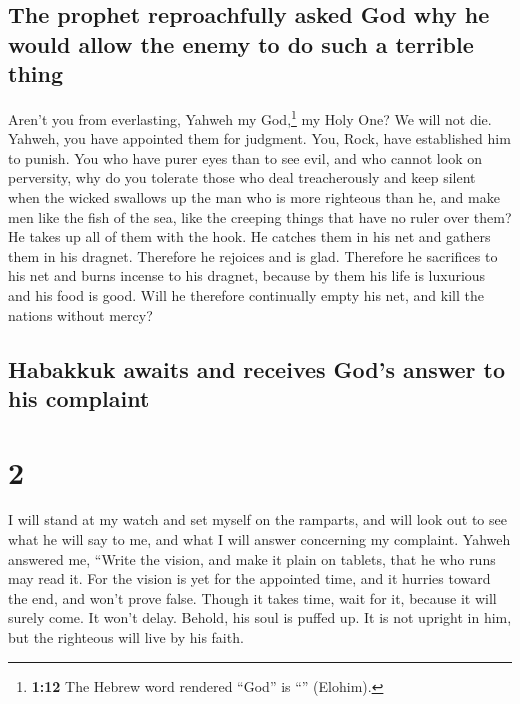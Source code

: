 \hypertarget{the-prophet-reproachfully-asked-god-why-he-would-allow-the-enemy-to-do-such-a-terrible-thing}{%
\subsection{The prophet reproachfully asked God why he would allow the
enemy to do such a terrible
thing}\label{the-prophet-reproachfully-asked-god-why-he-would-allow-the-enemy-to-do-such-a-terrible-thing}}

 Aren't you from everlasting, Yahweh my God,\footnote{\textbf{1:12}
  The Hebrew word rendered ``God'' is ``'' (Elohim).} my
Holy One? We will not die. Yahweh, you have appointed them for judgment.
You, Rock, have established him to punish.  You who have
purer eyes than to see evil, and who cannot look on perversity, why do
you tolerate those who deal treacherously and keep silent when the
wicked swallows up the man who is more righteous than he,
 and make men like the fish of the sea, like the creeping
things that have no ruler over them?  He takes up all of
them with the hook. He catches them in his net and gathers them in his
dragnet. Therefore he rejoices and is glad.  Therefore he
sacrifices to his net and burns incense to his dragnet, because by them
his life is luxurious and his food is good.  Will he
therefore continually empty his net, and kill the nations without mercy?

\hypertarget{habakkuk-awaits-and-receives-gods-answer-to-his-complaint}{%
\subsection{Habakkuk awaits and receives God's answer to his
complaint}\label{habakkuk-awaits-and-receives-gods-answer-to-his-complaint}}

\hypertarget{section-1}{%
\section{2}\label{section-1}}

 I will stand at my watch and set myself on the ramparts,
and will look out to see what he will say to me, and what I will answer
concerning my complaint.  Yahweh answered me, ``Write the
vision, and make it plain on tablets, that he who runs may read it.
 For the vision is yet for the appointed time, and it
hurries toward the end, and won't prove false. Though it takes time,
wait for it, because it will surely come. It won't delay. 
Behold, his soul is puffed up. It is not upright in him, but the
righteous will live by his faith.

